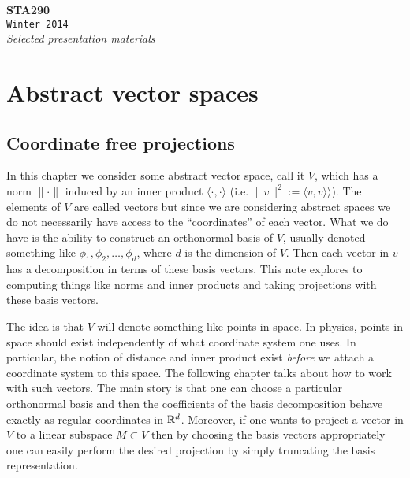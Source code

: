 \documentclass[11pt]{report}
\newcommand{\newchapter}[2]{
	\chapter{#1}
	\addtocontents{toc}{\vspace{.1in} \hspace{.25in} $\cdot$ #2 \par}
}
\newcommand*{\titleTH}{\begingroup %
	\center
	\vspace*{\baselineskip} %
	\vspace{2.5in}
	{\Huge\bfseries STA290}\\[\baselineskip] %
	{\Huge\texttt{Winter 2014}}\\[\baselineskip] %
	{\Large \textit{Selected presentation materials}}\par %
	\vspace*{3\baselineskip} %
\endgroup}
\begin{document}
\titleTH %
\thispagestyle{empty}
\tableofcontents




\chapter{Abstract vector spaces}

\section{Coordinate free projections}


In this chapter we consider some abstract vector space, call it $V$, which has a norm $\|\cdot \|$ induced by an inner product $\langle \cdot, \cdot \rangle$ (i.e. $\|v\|^2 := \langle v, v\rangle\rangle$). The elements of $V$ are called vectors but since we are considering abstract spaces we do not necessarily have access to the ``coordinates'' of each vector. What we do have is the ability to construct an orthonormal basis of $V$, usually denoted something like $\phi_1,\phi_2, \ldots, \phi_d$, where $d$ is the dimension of $V$. Then each vector in $v$ has a decomposition in terms of these basis vectors. This note explores to computing things like norms and inner products and taking projections with these basis vectors. 



The idea is that $V$ will denote something like points in space. In physics, points in space should exist independently of what coordinate system one uses. In particular, the notion of distance and inner product exist {\em before} we attach a coordinate system to this space. The following chapter talks about how to work with such vectors. The main story is that one can choose a particular orthonormal basis and then the coefficients of the basis decomposition behave exactly as regular coordinates in $\Bbb R^d$. Moreover, if one wants to project a vector in $V$ to a linear subspace $M\subset V$ then by choosing the basis vectors appropriately one can easily perform the desired projection by simply truncating the basis representation.
\end{document}
